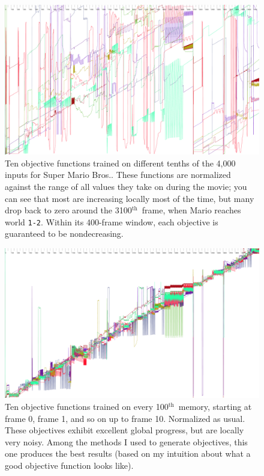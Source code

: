 \documentclass[twocolumn]{article}
\renewcommand\th{$^{\mathrm{th}}$}
\begin{document}
\begin{figure}[htb]
\begin{center}
\includegraphics[width=0.95 \linewidth]{mario-tenths}
\end{center}\vspace{-0.1in}
\caption{Ten objective functions trained on different tenths of the
  4,000 inputs for Super Mario Bros.. These functions are normalized
  against the range of all values they take on during the movie; you
  can see that most are increasing locally most of the time, but many
  drop back to zero around the 3100\th\ frame, when Mario reaches
  world {\tt 1-2}. Within its 400-frame window, each objective is
  guaranteed to be nondecreasing.}
\label{fig:tenths}
\end{figure}

\begin{figure}[htb]
\begin{center}
\includegraphics[width=0.95 \linewidth]{mario-strides}
\end{center}\vspace{-0.1in}
\caption{Ten objective functions trained on every 100\th\ memory,
  starting at frame 0, frame 1, and so on up to frame 10. Normalized
  as usual. These objectives exhibit excellent global progress, but
  are locally very noisy. Among the methods I used to generate
  objectives, this one produces the best results (based on my
  intuition about what a good objective function looks like).
}
\label{fig:strides}
\end{figure}
\end{document}

